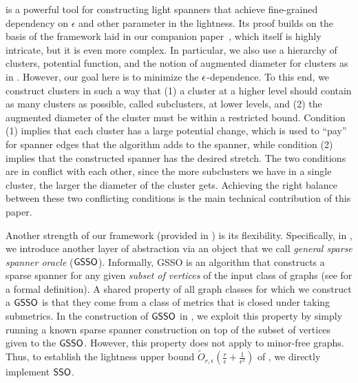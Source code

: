  is a powerful tool for constructing light spanners that achieve fine-grained dependency on $\epsilon$ and other parameter in the lightness. 
Its proof builds on the basis of the framework laid   in our companion paper~\cite{LS21}, which itself is highly intricate, but it is even more complex. In particular, we also use  a hierarchy of clusters, potential function, and the notion  of augmented diameter for clusters as in \cite{LS21}. However, our goal here is to minimize the $\epsilon$-dependence.  To this end, we construct clusters in such a way that (1) a cluster at a higher level should contain as many clusters as possible, called subclusters, at lower levels, and (2) the augmented diameter of the cluster must be within a restricted bound. Condition (1) implies that each cluster has a large potential change, which is used to ``pay'' for spanner edges that the algorithm adds to the spanner, while condition (2) implies that the constructed spanner has the desired stretch. The two conditions are in conflict with each other, since the more subclusters we have in a single cluster, the larger the diameter of the cluster gets. Achieving the right balance between these two conflicting conditions is the main technical contribution of this paper.  


Another strength of our framework (provided in ) is its flexibility. Specifically, in , we introduce another layer of abstraction via an object that we call \emph{general sparse spanner oracle} ($\mathsf{GSSO}$). Informally, GSSO is an algorithm that constructs a sparse spanner for any given \emph{subset of vertices} of the input class of graphs (see  for a formal definition).   A shared property of all graph classes for which we construct a $\mathsf{GSSO}$ is that they come from a class of metrics that is closed under taking submetrics. In the construction of $\mathsf{GSSO}$ in , we exploit this property by simply running a known sparse spanner construction on top of the subset of vertices given to the $\mathsf{GSSO}$. However, this property does not apply to minor-free graphs. Thus, to establish  the lightness upper bound $\tilde{O}_{r,\epsilon}(\frac{r}{\epsilon} + \frac{1}{\epsilon^2})$ of , we directly implement $\mathsf{SSO}$.
